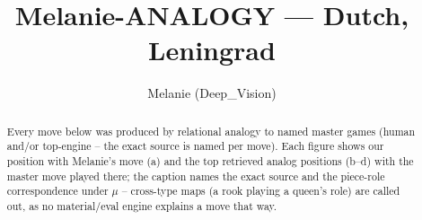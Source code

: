 \documentclass[11pt]{article}
\title{Melanie-ANALOGY — Dutch, Leningrad}
\author{Melanie (Deep\_Vision)}
\date{}
\begin{document}
\maketitle

\begin{abstract}Every move below was produced by relational analogy to named master games (human and/or top-engine -- the exact source is named per move). Each figure shows our position with Melanie's move (a) and the top retrieved analog positions (b--d) with the master move played there; the caption names the exact source and the piece-role correspondence under $\mu$ -- cross-type maps (a rook playing a queen's role) are called out, as no material/eval engine explains a move that way.\end{abstract}

\begin{figure}[p]\centering
\begin{subfigure}{0.46\textwidth}\centering
\resizebox{\linewidth}{!}{%
\newchessgame
\chessboard[
  setfen={rnbq1rk1/ppp1p1bp/3p1np1/5p2/2PP4/5NP1/PP2PPBP/RNBQ1RK1 w - - 0 7},
  showmover=false,
  pgfstyle=straightmove, color=movearrow, markmove={b1-c3}
]}
\caption{}
\end{subfigure}\hfill
\begin{subfigure}{0.46\textwidth}\centering
\resizebox{\linewidth}{!}{%
\newchessgame
\chessboard[
  setfen={rnbq1rk1/ppp1p1bp/3p1np1/5p2/2PP4/5NP1/PP2PPBP/RNBQ1RK1 w - - 0 7},
  showmover=false,
  pgfstyle=straightmove, color=movearrow, markmove={b1-c3}
]}
\caption{}
\end{subfigure}
\\[4pt]
\begin{subfigure}{0.46\textwidth}\centering
\resizebox{\linewidth}{!}{%
\newchessgame
\chessboard[
  setfen={rnbq1rk1/ppp1p1bp/3p1np1/5p2/2PP4/5NP1/PP2PPBP/RNBQ1RK1 w - - 0 7},
  showmover=false,
  pgfstyle=straightmove, color=movearrow, markmove={b1-c3}
]}
\caption{}
\end{subfigure}\hfill
\begin{subfigure}{0.46\textwidth}\centering
\resizebox{\linewidth}{!}{%
\newchessgame
\chessboard[
  setfen={rnbq1rk1/ppp1p1bp/3p1np1/5p2/2PP4/5NP1/PP2PPBP/RNBQ1RK1 w - - 0 7},
  showmover=false,
  pgfstyle=straightmove, color=movearrow, markmove={b1-c3}
]}
\caption{}
\end{subfigure}

\end{figure}
\end{document}
